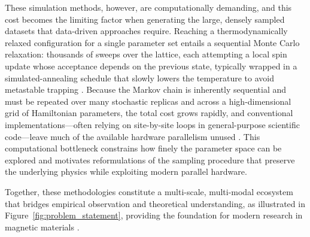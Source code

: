 \documentclass[letterpaper, 12, one column]{article}
\begin{document}
These simulation methods, however, are computationally demanding, and this cost becomes the limiting factor when generating the large, densely sampled datasets that data-driven approaches require. Reaching a thermodynamically relaxed configuration for a single parameter set entails a sequential Monte Carlo relaxation: thousands of sweeps over the lattice, each attempting a local spin update whose acceptance depends on the previous state, typically wrapped in a simulated-annealing schedule that slowly lowers the temperature to avoid metastable trapping \cite{Chrobak2020Atomic}. Because the Markov chain is inherently sequential and must be repeated over many stochastic replicas and across a high-dimensional grid of Hamiltonian parameters, the total cost grows rapidly, and conventional implementations---often relying on site-by-site loops in general-purpose scientific code---leave much of the available hardware parallelism unused \cite{Misiurev2024Modeling}. This computational bottleneck constrains how finely the parameter space can be explored and motivates reformulations of the sampling procedure that preserve the underlying physics while exploiting modern parallel hardware.

Together, these methodologies constitute a multi-scale, multi-modal ecosystem that bridges empirical observation and theoretical understanding, as illustrated in Figure~\ref{fig:problem_statement}, providing the foundation for modern research in magnetic materials \cite{Misiurev2024Modeling}.
\end{document}
